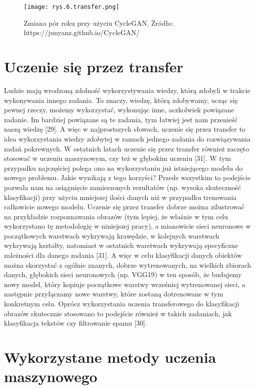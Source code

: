 \begin{figure}[h]
    \centering
    \texttt{[image: rys.6.transfer.png]}
    \caption{Zmiana pór roku przy użyciu CycleGAN. Żródło: https://junyanz.github.io/CycleGAN/}
    \label{fig:mesh6}
\end{figure}

\section{Uczenie się przez transfer}
\label{cha:cha3.5}

Ludzie mają wrodzoną zdolność wykorzystywania wiedzy, którą zdobyli w trakcie wykonywania innego zadania. To znaczy, wiedzę, którą zdobywamy, ucząc się pewnej rzeczy, możemy wykorzystać, wykonując inne, aczkolwiek powiązane zadanie. Im bardziej powiązane są te zadania, tym łatwiej jest nam przenieść naszą wiedzę [29]. A więc w najprostszych słowach, uczenie się przez transfer to idea wykorzystania wiedzy zdobytej w ramach jednego zadania do rozwiązywania zadań pokrewnych. W ostatnich latach uczenie się przez transfer również zaczęto stosować w uczeniu maszynowym, czy też w głębokim uczeniu [31]. W tym przypadku najczęściej polega ono na wykorzystaniu już istniejącego modelu do nowego problemu. Jakie wynikają z tego korzyści? Przede wszystkim to podejście pozwala nam na osiągnięcie zamierzonych rezultatów (np. wysoka skuteczność klasyfikacji) przy użyciu mniejszej ilości danych niż w przypadku trenowania całkowicie nowego modelu. 
Uczenie się przez transfer dobrze można zilustrować na przykładzie rozpoznawania obrazów (tym lepiej, że właśnie w tym celu wykorzystano tę metodologię w niniejszej pracy), a mianowicie sieci neuronowe w początkowych warstwach wykrywają krawędzie, w kolejnych warstwach wykrywają kształty, natomiast w ostatnich warstwach wykrywają specyficzne zależności dla danego zadania [31]. A więc w celu klasyfikacji danych obiektów można skorzystać z ogólnie znanych, dobrze wytrenowanych, na wielkich zbiorach danych, głębokich sieci neuronowych (np. VGG19) w ten sposób, że budujemy nowy model, który kopiuje początkowe warstwy wcześniej wytrenowanej sieci, a następnie przyłączamy nowe warstwy, które zostaną dotrenowane w tym konkretnym celu. Oprócz wykorzystania uczenia transferowego do klasyfikacji obrazów skutecznie stosowano to podejście również w takich zadaniach, jak klasyfikacja tekstów czy filtrowanie spamu [30]. 


\section{Wykorzystane metody uczenia maszynowego}
\label{cha:Wykorzystane metody uczenia maszynowego}

